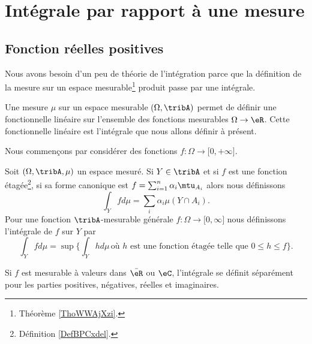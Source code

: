 
\section{Intégrale par rapport à une mesure}

\subsection{Fonction réelles positives}

Nous avons besoin d'un peu de théorie de l'intégration parce que la définition de la mesure sur un espace mesurable\footnote{Théorème \ref{ThoWWAjXzi}.} produit passe par une intégrale.

Une mesure \( \mu\) sur un espace mesurable \( (\Omega,\tribA)\) permet de définir une fonctionnelle linéaire sur l'ensemble des fonctions mesurables \( \Omega\to \eR\). Cette fonctionnelle linéaire est l'intégrale que nous allons définir à présent.

Nous commençons par considérer des fonctions \( f\colon \Omega\to \mathopen[ 0 , +\infty \mathclose]\).

\begin{definition}  \label{DefTVOooleEst}
    Soit \( (\Omega,\tribA,\mu)\) un espace mesuré. Si \( Y\in \tribA\) et si \( f\) est une fonction étagée\footnote{Définition \ref{DefBPCxdel}.}, si sa forme canonique est \( f=\sum_{i=1}^n\alpha_i\mtu_{A_i}\) alors nous définissons
    \begin{equation}        \label{EqooGAFMooZLzjPs}
        \int_Yfd\mu=\sum_i\alpha_i\mu(Y\cap A_i).
    \end{equation}
    Pour une fonction \( \tribA\)-mesurable générale \( f\colon \Omega\to \mathopen[ 0 , \infty \mathclose]\) nous définissons l'intégrale de \( f\) sur \( Y\) par
    \begin{equation}        \label{EqDefintYfdmu}
        \int_Yfd\mu=\sup\Big\{ \int_Yhd\mu\,\text{où } h\text{ est une fonction étagée telle que } 0\leq h\leq f \Big\}.
    \end{equation}

    Si $f$ est mesurable à valeurs dans \( \bar \eR\) ou \( \eC\), l'intégrale se définit séparément pour les parties positives, négatives, réelles et imaginaires.
\end{definition}

